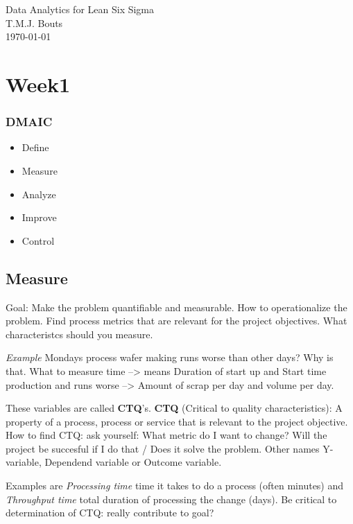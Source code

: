 

\setcounter{page}{1}
\vspace*{-2.5cm}
\begin{center}
\large{\textsf{Data Analytics for Lean Six Sigma \\
T.M.J. Bouts \\
\today}}
\section*{Week1}
\setcounter{section}{1}
\setcounter{subsection}{1}
\end{center}
\subsubsection{DMAIC}
\begin{itemize}
    \item Define
    \item Measure
    \item Analyze
    \item Improve
    \item Control
\end{itemize}
\subsection{Measure}
Goal: Make the problem quantifiable and measurable. How to operationalize the problem. 
Find process metrics that are relevant for the project objectives. What characteristcs should you measure.

\emph{Example}
Mondays process wafer making runs worse than other days? Why is that. What to measure time --> means Duration of start up and Start time production and runs worse --> Amount of scrap per day and volume per day.

These variables are called \textbf{CTQ}'s. 
\textbf{CTQ} (Critical to quality characteristics): A property of a process, process or service that is relevant to the project objective.
How to find CTQ:
ask yourself: What metric do I want to change? Will the project be succesful if I do that / Does it solve the problem. Other names Y-variable, Dependend variable or Outcome variable.

Examples are \textit{Processing time} time it takes to do a process (often minutes) and \textit{Throughput time} total duration of processing the change (days). Be critical to determination of CTQ: really contribute to goal?

